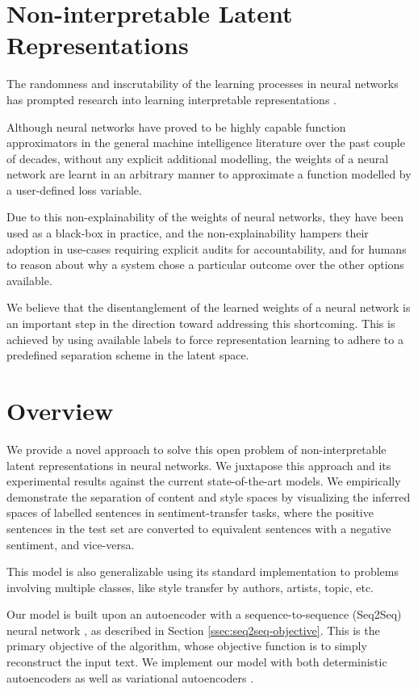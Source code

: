 \section{Non-interpretable Latent Representations}

The randomness and inscrutability of the learning processes in neural networks has prompted research into learning interpretable representations \citep{chen2016infogan}.

Although neural networks have proved to be highly capable function approximators in the general machine intelligence literature over the past couple of decades, without any explicit additional modelling, the weights of a neural network are learnt in an arbitrary manner to approximate a function modelled by a user-defined loss variable.

Due to this non-explainability of the weights of neural networks, they have been used as a black-box in practice, and the non-explainability hampers their adoption in use-cases requiring explicit audits for accountability, and for humans to reason about why a system chose a particular outcome over the other options available.

We believe that the disentanglement of the learned weights of a neural network is an important step in the direction toward addressing this shortcoming. This is achieved by using available labels to force representation learning to adhere to a predefined separation scheme in the latent space.


\section{Overview}

We provide a novel approach to solve this open problem of non-interpretable latent representations in neural networks. We juxtapose this approach and its experimental results against the current state-of-the-art models. We empirically demonstrate the separation of content and style spaces by visualizing the inferred spaces of labelled sentences in sentiment-transfer tasks, where the positive sentences in the test set are converted to equivalent sentences with a negative sentiment, and vice-versa.

This model is also generalizable using its standard implementation to problems involving multiple classes, like style transfer by authors, artists, topic, etc.

Our model is built upon an autoencoder with a sequence-to-sequence (Seq2Seq) neural network \citep{sutskever2014sequence}, as described in Section \ref{ssec:seq2seq-objective}. This is the primary objective of the algorithm, whose objective function is to simply reconstruct the input text. We implement our model with both deterministic autoencoders \citep{baldi2012autoencoders} as well as variational autoencoders \citep{kingma2013auto}.

